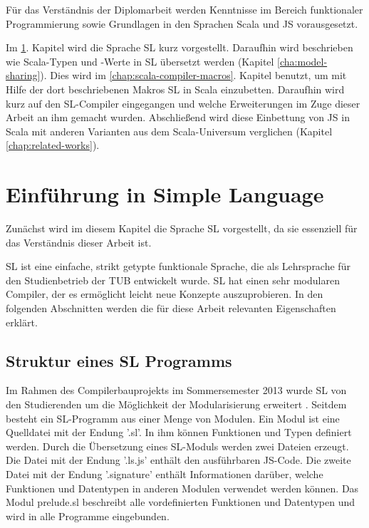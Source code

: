 \documentclass[12pt,bibtotoc]{scrreprt}
\begin{document}
Für das Verständnis der Diplomarbeit werden Kenntnisse im Bereich funktionaler Programmierung sowie Grundlagen in den Sprachen Scala und JS vorausgesetzt.

Im \ref{cha:sl-introduction}. Kapitel wird die Sprache SL kurz vorgestellt. Daraufhin wird beschrieben wie Scala-Typen und -Werte in SL übersetzt werden (Kapitel \ref{cha:model-sharing}). Dies wird im \ref{chap:scala-compiler-macros}. Kapitel benutzt, um mit Hilfe der dort beschriebenen Makros SL in Scala einzubetten. Daraufhin wird kurz auf den SL-Compiler eingegangen und welche Erweiterungen im Zuge dieser Arbeit an ihm gemacht wurden. Abschließend wird diese Einbettung von JS in Scala mit anderen Varianten aus dem Scala-Universum verglichen (Kapitel \ref{chap:related-works}). 

\chapter{Einführung in Simple Language}
\label{cha:sl-introduction}

Zunächst wird im diesem Kapitel die Sprache SL vorgestellt, da sie essenziell für das Verständnis dieser Arbeit ist.

SL ist eine einfache, strikt getypte funktionale Sprache, die als Lehrsprache für den Studienbetrieb der \ac{TUB} entwickelt wurde. SL hat einen sehr modularen Compiler, der es ermöglicht leicht neue Konzepte auszuprobieren. In den folgenden Abschnitten werden die für diese Arbeit relevanten Eigenschaften erklärt.

\section{Struktur eines SL Programms}

Im Rahmen des Compilerbauprojekts im Sommersemester 2013 wurde SL von den Studierenden um die Möglichkeit der Modularisierung erweitert \cite{Bisping2013}. Seitdem besteht ein SL-Programm aus einer Menge von Modulen. Ein Modul ist eine Quelldatei mit der Endung '.sl'. In ihm können Funktionen und Typen definiert werden. Durch die Übersetzung eines SL-Moduls werden zwei Dateien erzeugt. Die Datei mit der Endung '.ls.js' enthält den ausführbaren JS-Code. Die zweite Datei mit der Endung '.signature' enthält Informationen darüber, welche Funktionen und Datentypen in anderen Modulen verwendet werden können. Das Modul prelude.sl beschreibt alle vordefinierten Funktionen und Datentypen und wird in alle Programme eingebunden. 
\end{document}
